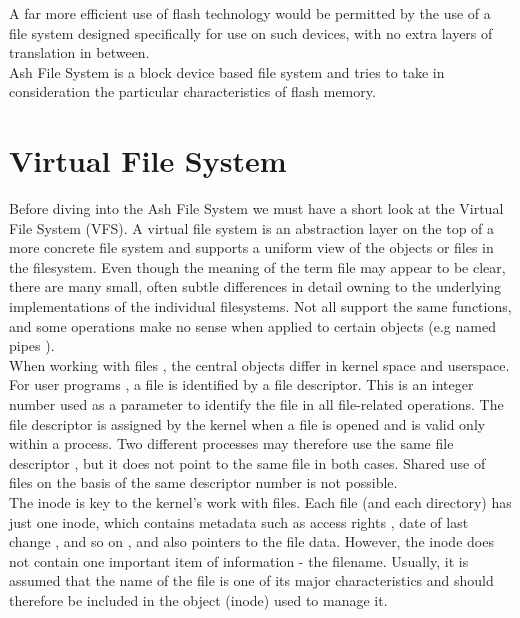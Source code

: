 \documentclass[conference]{IEEEtran}
\begin{document}
A far more efficient use of flash technology would be permitted by the use of a file 
system designed specifically for use on such devices, with no extra layers of translation in 
between.\\

Ash File System is a block device based file system and tries to take in consideration
the particular characteristics of flash memory.

\section{Virtual File System}
Before diving into the Ash File System we must have a short look at the Virtual File System (VFS). A virtual file system
is an abstraction layer on the top of a more concrete file system and supports a uniform view of the objects or files
in the filesystem. Even though the meaning of the term file may appear to be clear, there are many small, often subtle 
differences in detail owning to the underlying implementations of the individual filesystems. Not all support the same 
functions, and some operations make no sense when applied to certain objects (e.g named pipes ). \\

When working with files , the central objects differ in kernel space and userspace. For user programs , a file is 
identified by a file descriptor. This is an integer number used as a parameter to identify the file in all file-related
operations. The file descriptor is assigned by the kernel when a file is opened and is valid only within a process. Two 
different processes may therefore use the same file descriptor , but it does not point to the same file in both cases.
Shared use of files on the basis of the same descriptor number is not possible. \\

The inode is key to the kernel's work with files. Each file (and each directory) has just one inode, which contains 
metadata such as  access rights , date of last change , and so on , and also pointers to the file data.
However, the inode does not contain one important item of information - the filename. Usually, it is assumed that the 
name of the file is one of its major characteristics and should therefore be included in the object (inode) used to 
manage it. 
\end{document}
